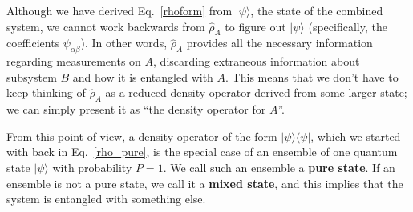 \documentclass[prx,12pt]{revtex4-2}
\begin{document}
Although we have derived Eq.~\eqref{rhoform} from $|\psi\rangle$, the
state of the combined system, we cannot work backwards from
$\hat{\rho}_A$ to figure out $|\psi\rangle$ (specifically, the
coefficients $\psi_{\alpha\beta}$).  In other words, $\hat{\rho}_A$
provides all the necessary information regarding measurements on $A$,
discarding extraneous information about subsystem $B$ and how it is
entangled with $A$.  This means that we don't have to keep thinking of
$\hat{\rho}_A$ as a reduced density operator derived from some larger
state; we can simply present it as ``the density operator for $A$''.

From this point of view, a density operator of the form
$|\psi\rangle\langle\psi|$, which we started with back in
Eq.~\eqref{rho_pure}, is the special case of an ensemble of one
quantum state $|\psi\rangle$ with probability $P = 1$.  We call such
an ensemble a \textbf{pure state}.  If an ensemble is not a pure
state, we call it a \textbf{mixed state}, and this implies that the
system is entangled with something else.
\end{document}
